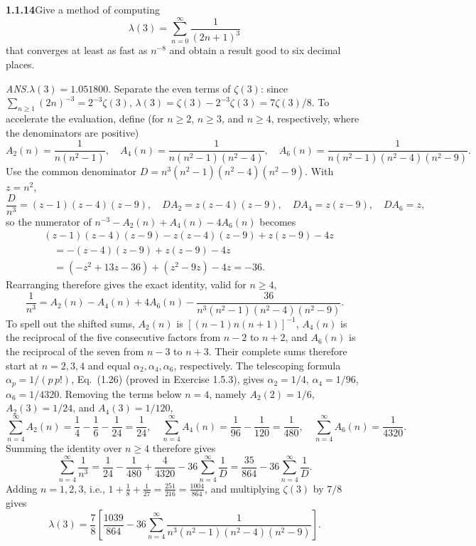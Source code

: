 \par\bigskip
\noindent\textbf{1.1.14}\quad Give a method of computing
\[
\lambda(3)=\sum_{n=0}^{\infty}\frac{1}{(2n+1)^{3}}
\]
that converges at least as fast as $n^{-8}$ and obtain a result good to six
decimal places.
\par\nobreak\hfill\emph{ANS.}\enspace $\lambda(3)=1.051800$.
\solution
Separate the even terms of $\zeta(3)$: since
$\sum_{n\ge1}(2n)^{-3}=2^{-3}\zeta(3)$,
$\lambda(3)=\zeta(3)-2^{-3}\zeta(3)=7\zeta(3)/8$.
To accelerate the evaluation, define (for $n\ge2$, $n\ge3$, and $n\ge4$,
respectively, where the denominators are positive)
\[
 A_2(n)=\frac1{n(n^2-1)},\quad
 A_4(n)=\frac1{n(n^2-1)(n^2-4)},\quad
 A_6(n)=\frac1{n(n^2-1)(n^2-4)(n^2-9)}.
\]
Use the common denominator
$D=n^3(n^2-1)(n^2-4)(n^2-9)$. With $z=n^2$,
\[
 \frac D{n^3}=(z-1)(z-4)(z-9),\quad DA_2=z(z-4)(z-9),\quad
 DA_4=z(z-9),\quad DA_6=z,
\]
so the numerator of $n^{-3}-A_2(n)+A_4(n)-4A_6(n)$ becomes
\[
 \begin{aligned}
 &(z-1)(z-4)(z-9)-z(z-4)(z-9)+z(z-9)-4z\\
 &\quad=-(z-4)(z-9)+z(z-9)-4z\\
 &\quad=(-z^2+13z-36)+(z^2-9z)-4z=-36.
 \end{aligned}
\]
Rearranging therefore gives the exact identity, valid for $n\ge4$,
\[
 \frac1{n^3}=A_2(n)-A_4(n)+4A_6(n)
 -\frac{36}{n^3(n^2-1)(n^2-4)(n^2-9)}.
\]
To spell out the shifted sums, $A_2(n)$ is
$[(n-1)n(n+1)]^{-1}$, $A_4(n)$ is the reciprocal of the five
consecutive factors from $n-2$ to $n+2$, and $A_6(n)$ is the reciprocal
of the seven from $n-3$ to $n+3$. Their complete sums therefore start
at $n=2,3,4$ and equal $\alpha_2,\alpha_4,\alpha_6$, respectively.
The telescoping formula $\alpha_p=1/(p\,p!)$, Eq.~(1.26) (proved in
Exercise 1.5.3), gives $\alpha_2=1/4$, $\alpha_4=1/96$, $\alpha_6=1/4320$.
Removing the terms below $n=4$, namely $A_2(2)=1/6$, $A_2(3)=1/24$, and
$A_4(3)=1/120$,
\[
 \sum_{n=4}^\infty A_2(n)=\frac14-\frac16-\frac1{24}=\frac1{24},
 \quad \sum_{n=4}^\infty A_4(n)=\frac1{96}-\frac1{120}=\frac1{480},
 \quad \sum_{n=4}^\infty A_6(n)=\frac1{4320}.
\]
Summing the identity over $n\ge4$ therefore gives
\[
 \sum_{n=4}^\infty\frac1{n^3}=\frac1{24}-\frac1{480}+\frac4{4320}
 -36\sum_{n=4}^\infty\frac1D
 =\frac{35}{864}-36\sum_{n=4}^\infty\frac1D.
\]
Adding $n=1,2,3$, i.e., $1+\frac18+\frac1{27}=\frac{251}{216}=\frac{1004}{864}$,
and multiplying $\zeta(3)$ by $7/8$ gives
\[
 \boxed{\lambda(3)=\frac78\left[\frac{1039}{864}
 -36\sum_{n=4}^\infty
 \frac1{n^3(n^2-1)(n^2-4)(n^2-9)}\right]}.
\]
